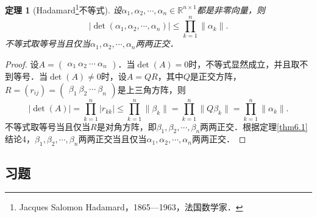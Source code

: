 \documentclass[a4paper,fontset=windows]{ctexbook}
\newtheorem{theorem}{定理}[chapter]
\theoremstyle{definition}
\renewcommand{\le}{\leqslant}
\begin{document}
\begin{theorem}[Hadamard\footnote{Jacques Salomon Hadamard，1865—1963，法国数学家．}不等式]
设$\alpha_1,\alpha_2,\cdots,\alpha_n\in\mathbb{R}^{n\times 1}$都是非零向量，则
$$|\det(\alpha_1,\alpha_2,\cdots,\alpha_n)|\le\prod\limits_{k=1}^n\|\alpha_k\|.$$
不等式取等号当且仅当$\alpha_1,\alpha_2,\cdots,\alpha_n$两两正交．
\end{theorem}

\begin{proof}
设$A=\begin{pmatrix}\alpha_1~\alpha_2~\cdots~\alpha_n\end{pmatrix}$．当$\det(A)=0$时，不等式显然成立，并且取不到等号．当$\det(A)\ne 0$时，设$A=QR$，其中$Q$是正交方阵，$R=(r_{ij})=\begin{pmatrix}\beta_1~\beta_2~\cdots~\beta_n\end{pmatrix}$是上三角方阵，则
$$|\det(A)|=\prod_{k=1}^n|r_{kk}|\le\prod_{k=1}^n\|\beta_k\|=\prod_{k=1}^n\|Q\beta_k\|=\prod_{k=1}^n\|\alpha_k\|.$$
不等式取等号当且仅当$R$是对角方阵，即$\beta_1,\beta_2,\cdots,\beta_n$两两正交．根据定理\ref{thm6.1} 结论4，$\beta_1,\beta_2,\cdots,\beta_n$两两正交当且仅当$\alpha_1,\alpha_2,\cdots,\alpha_n$两两正交．
\end{proof}

\subsection*{习题}
\end{document}
